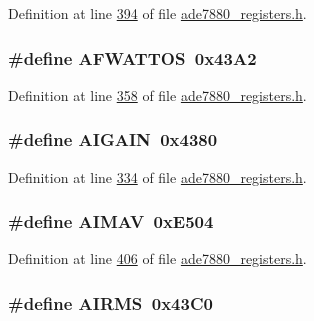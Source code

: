 Definition at line \hyperlink{a00036_source_l00394}{394} of file \hyperlink{a00036_source}{ade7880\-\_\-registers.\-h}.

\hypertarget{a00036_a2037a4c64099cc2241d21cb82d8a3c89}{
\subsubsection[{A\-F\-W\-A\-T\-T\-O\-S}]{\setlength{\rightskip}{0pt plus 5cm}\#define A\-F\-W\-A\-T\-T\-O\-S~0x43\-A2}}\label{de/d8c/a00036_a2037a4c64099cc2241d21cb82d8a3c89}


Definition at line \hyperlink{a00036_source_l00358}{358} of file \hyperlink{a00036_source}{ade7880\-\_\-registers.\-h}.

\hypertarget{a00036_a8a19559f0146d0aa49b05556cde296e4}{
\subsubsection[{A\-I\-G\-A\-I\-N}]{\setlength{\rightskip}{0pt plus 5cm}\#define A\-I\-G\-A\-I\-N~0x4380}}\label{de/d8c/a00036_a8a19559f0146d0aa49b05556cde296e4}


Definition at line \hyperlink{a00036_source_l00334}{334} of file \hyperlink{a00036_source}{ade7880\-\_\-registers.\-h}.

\hypertarget{a00036_a1216d73466d1d804f373b8cc7aa77bd7}{
\subsubsection[{A\-I\-M\-A\-V}]{\setlength{\rightskip}{0pt plus 5cm}\#define A\-I\-M\-A\-V~0x\-E504}}\label{de/d8c/a00036_a1216d73466d1d804f373b8cc7aa77bd7}


Definition at line \hyperlink{a00036_source_l00406}{406} of file \hyperlink{a00036_source}{ade7880\-\_\-registers.\-h}.

\hypertarget{a00036_afae37e821d8947e31a63759e4bb57355}{
\subsubsection[{A\-I\-R\-M\-S}]{\setlength{\rightskip}{0pt plus 5cm}\#define A\-I\-R\-M\-S~0x43\-C0}}\label{de/d8c/a00036_afae37e821d8947e31a63759e4bb57355}


